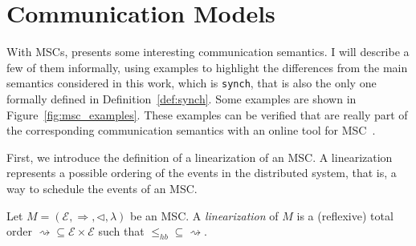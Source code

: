 \section{Communication Models}

With MSCs, \cite{di2023partial} presents some interesting communication
semantics. I will describe a few of them informally, using examples to
highlight the differences from the main semantics considered in this work,
which is \verb|synch|, that is also the only one formally defined in 
Definition~\ref{def:synch}. Some examples are
shown in Figure~\ref{fig:msc_examples}. These examples can be verified that 
are really part of the corresponding communication semantics with an online
tool for MSC~\cite{MSCTool}.

First, we introduce the definition of a linearization of an MSC. A
linearization represents a possible ordering of the events in the distributed
system, that is, a way to schedule the events of an MSC.

\begin{definition}
	Let $M = (\mathcal{E}, \Rightarrow, \triangleleft, \lambda)$ be an MSC.
	A \emph{linearization} of $M$ is a (reflexive) total order
	$\rightsquigarrow \subseteq \mathcal{E} \times \mathcal{E}$ such that
	$\leq_{hb} \subseteq \rightsquigarrow$.
\end{definition}

